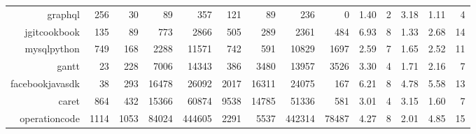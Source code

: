\begin{table}[t]
{\begin{tabular}{rrrrrrrrrrrrrr}
graphql                 & 256     & 30    & 89                   & 357               & 121                             & 89                                 & 236                                        & 0                                             & 1.40              & 2            & 3.18         & 1.11                 & 4                 \\
jgitcookbook            & 135     & 89    & 773                  & 2866              & 505                             & 289                                & 2361                                       & 484                                           & 6.93              & 8            & 1.33         & 2.68                 & 14                \\
mysqlpython             & 749     & 168   & 2288                 & 11571             & 742                             & 591                                & 10829                                      & 1697                                          & 2.59              & 7            & 1.65         & 2.52                 & 11                \\
gantt                   & 23      & 228   & 7006                 & 14343             & 386                             & 3480                               & 13957                                      & 3526                                          & 3.30              & 4            & 1.71         & 2.16                 & 7                 \\
facebookjavasdk         & 38      & 293   & 16478                & 26092             & 2017                            & 16311                              & 24075                                      & 167                                           & 6.21              & 8            & 4.78         & 5.58                 & 13                \\
caret                   & 864     & 432   & 15366                & 60874             & 9538                            & 14785                              & 51336                                      & 581                                           & 3.01              & 4            & 3.15         & 1.60                 & 7                 \\
operationcode           & 1114    & 1053  & 84024                & 444605            & 2291                            & 5537                               & 442314                                     & 78487                                         & 4.27              & 8            & 2.01         & 4.85                 & 15               \\ \bottomrule
\end{tabular}%
}
\end{table}
